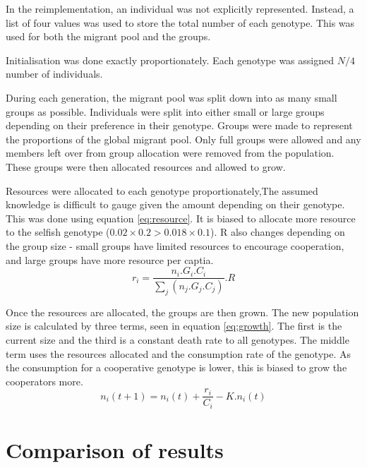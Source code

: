 \documentclass[11pt]{ecsarticle}
\begin{document}
In the reimplementation, an individual was not explicitly represented. 
Instead, a list of four values was used to store the total number of each genotype. 
This was used for both the migrant pool and the groups. 

Initialisation was done exactly proportionately. Each genotype was assigned $N / 4$ number of individuals.

During each generation, the migrant pool was split down into as many small groups as possible.
Individuals were split into either small or large groups depending on their preference in their genotype.
Groups were made to represent the proportions of the global migrant pool. 
Only full groups were allowed and any members left over from group allocation were removed from the population. 
These groups were then allocated resources and allowed to grow. 

Resources were allocated to each genotype proportionately,The assumed knowledge is difficult to gauge given the amount depending on their genotype.
This was done using equation \eqref{eq:resource}. 
It is biased to allocate more resource to the selfish genotype ($0.02 \times 0.2 > 0.018 \times 0.1$). 
R also changes depending on the group size - small groups have limited resources to encourage cooperation, and large groups have more resource per captia.
\begin{equation}
 r_i = \frac{ n_i . G_i . C_i }{\sum\limits_j (n_j . G_j . C_j )} . R 
 \label{eq:resource}
\end{equation}

Once the resources are allocated, the groups are then grown. 
The new population size is calculated by three terms, seen in equation \ref{eq:growth}. 
The first is the current size and the third is a constant death rate to all genotypes.
The middle term uses the resources allocated and the consumption rate of the genotype.
As the consumption for a cooperative genotype is lower, this is biased to grow the cooperators more.
\begin{equation}
 n_i (t + 1) = n_i (t) + \frac{r_i}{C_i} - K.n_i (t)
 \label{eq:growth}
\end{equation}



\section{Comparison of results}\label{sc:reimp:results}
\end{document}
